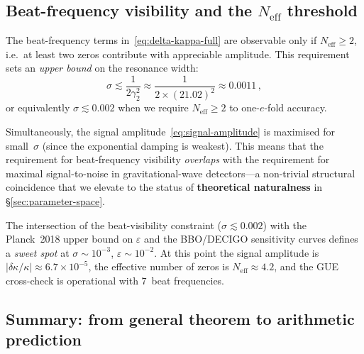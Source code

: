 \documentclass[12pt,a4paper]{article}
\begin{document}
\subsection{Beat-frequency visibility and the
  $N_{\mathrm{eff}}$ threshold}\label{ssec:beat-visibility}

The beat-frequency terms in~\eqref{eq:delta-kappa-full} are
observable only if $N_{\mathrm{eff}}\geq 2$, i.e.\ at least two
zeros contribute with appreciable amplitude.  This requirement sets an
\emph{upper bound} on the resonance width:
\begin{equation}\label{eq:sigma-bound}
  \sigma
  \lesssim \frac{1}{2\gamma_{2}^{2}}
  \approx \frac{1}{2\times(21.02)^{2}}
  \approx 0.0011\,,
\end{equation}
or equivalently $\sigma\lesssim 0.002$ when we require
$N_{\mathrm{eff}}\geq 2$ to one-$e$-fold accuracy.

Simultaneously, the signal amplitude~\eqref{eq:signal-amplitude}
is maximised for small~$\sigma$ (since the exponential damping is
weakest).  This means that the requirement for beat-frequency
visibility \emph{overlaps} with the requirement for maximal
signal-to-noise in gravitational-wave detectors---a non-trivial
structural coincidence that we elevate to the status of
\textbf{theoretical naturalness} in
\S\ref{sec:parameter-space}.

\begin{remark}
The intersection of the beat-visibility constraint
($\sigma\lesssim 0.002$) with the Planck~2018 upper bound on
$\varepsilon$ and the BBO/DECIGO sensitivity curves defines a
\emph{sweet spot} at $\sigma\sim 10^{-3}$, $\varepsilon\sim 10^{-2}$.
At this point the signal amplitude is
$|\delta\kappa/\kappa|\approx 6.7\times 10^{-5}$, the effective
number of zeros is $N_{\mathrm{eff}}\approx 4.2$, and the GUE
cross-check is operational with 7~beat frequencies.
\end{remark}

\subsection{Summary: from general theorem to arithmetic
  prediction}\label{ssec:sec3-summary}
\end{document}
